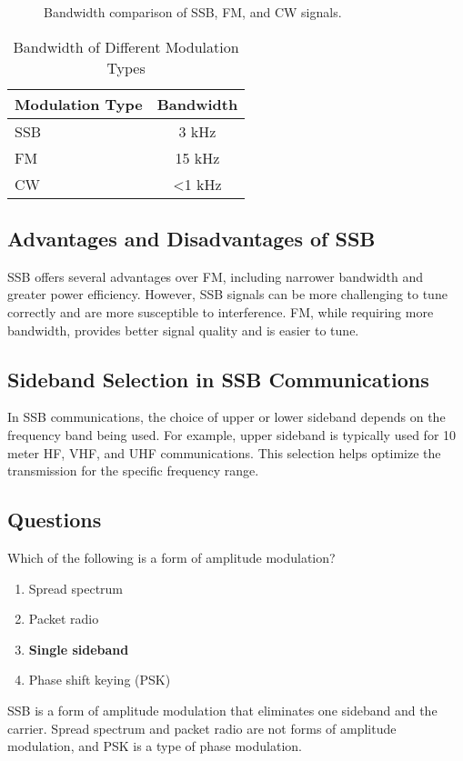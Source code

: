 \begin{figure}[h!]
    \centering
    \caption{Bandwidth comparison of SSB, FM, and CW signals.}
    \label{fig:bandwidth_comparison}
\end{figure}

\begin{table}[h!]
    \centering
    \begin{tabular}{|l|c|}
        \hline
        \textbf{Modulation Type} & \textbf{Bandwidth} \\
        \hline
        SSB & 3 kHz \\
        FM & 15 kHz \\
        CW & <1 kHz \\
        \hline
    \end{tabular}
    \caption{Bandwidth of Different Modulation Types}
    \label{tab:bandwidth_summary}
\end{table}

\subsection*{Advantages and Disadvantages of SSB}
SSB offers several advantages over FM, including narrower bandwidth and greater power efficiency. However, SSB signals can be more challenging to tune correctly and are more susceptible to interference. FM, while requiring more bandwidth, provides better signal quality and is easier to tune.

\subsection*{Sideband Selection in SSB Communications}
In SSB communications, the choice of upper or lower sideband depends on the frequency band being used. For example, upper sideband is typically used for 10 meter HF, VHF, and UHF communications. This selection helps optimize the transmission for the specific frequency range.

\subsection*{Questions}
\begin{tcolorbox}[colback=gray!10!white,colframe=black!75!black,title={T8A01}]
    Which of the following is a form of amplitude modulation?
    \begin{enumerate}[label=\Alph*),noitemsep]
        \item Spread spectrum
        \item Packet radio
        \item \textbf{Single sideband}
        \item Phase shift keying (PSK)
    \end{enumerate}
\end{tcolorbox}
SSB is a form of amplitude modulation that eliminates one sideband and the carrier. Spread spectrum and packet radio are not forms of amplitude modulation, and PSK is a type of phase modulation.


